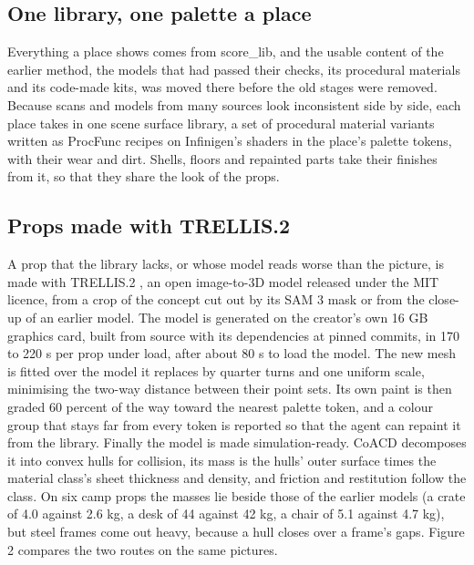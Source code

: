 \subsection{One library, one palette a place}\label{one-library-one-palette-a-place}

Everything a place shows comes from score\_lib, and the usable content of the earlier method, the models that had passed their checks, its procedural materials and its code-made kits, was moved there before the old stages were removed. Because scans and models from many sources look inconsistent side by side, each place takes in one scene surface library, a set of procedural material variants written as ProcFunc recipes \citep{raistrick2026procfunc} on Infinigen's shaders \citep{raistrick2023infinigen} in the place's palette tokens, with their wear and dirt. Shells, floors and repainted parts take their finishes from it, so that they share the look of the props.

\subsection{Props made with TRELLIS.2}\label{props-made-with-trellis.2}

A prop that the library lacks, or whose model reads worse than the picture, is made with TRELLIS.2 \citep{trellis2}, an open image-to-3D model released under the MIT licence, from a crop of the concept cut out by its SAM 3 mask or from the close-up of an earlier model. The model is generated on the creator's own 16 GB graphics card, built from source with its dependencies at pinned commits, in 170 to 220 s per prop under load, after about 80 s to load the model. The new mesh is fitted over the model it replaces by quarter turns and one uniform scale, minimising the two-way distance between their point sets. Its own paint is then graded 60 percent of the way toward the nearest palette token, and a colour group that stays far from every token is reported so that the agent can repaint it from the library. Finally the model is made simulation-ready. CoACD \citep{wei2022coacd} decomposes it into convex hulls for collision, its mass is the hulls' outer surface times the material class's sheet thickness and density, and friction and restitution follow the class. On six camp props the masses lie beside those of the earlier models (a crate of 4.0 against 2.6 kg, a desk of 44 against 42 kg, a chair of 5.1 against 4.7 kg), but steel frames come out heavy, because a hull closes over a frame's gaps. Figure 2 compares the two routes on the same pictures.

